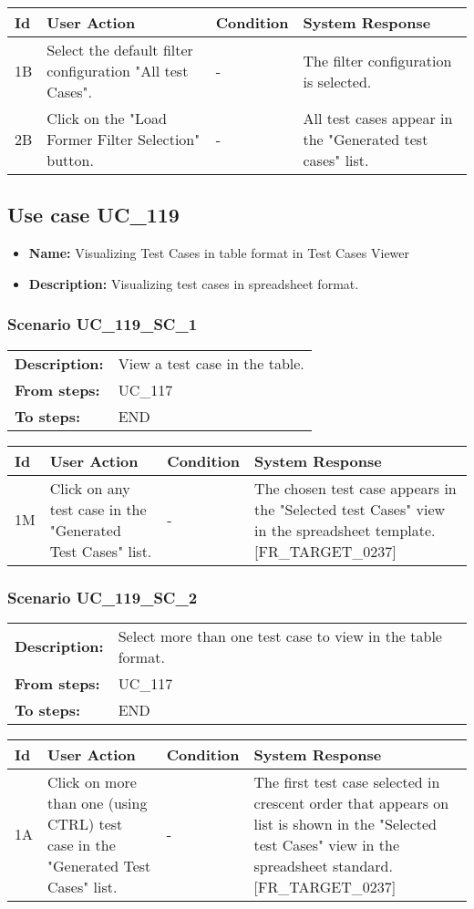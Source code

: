 \documentclass[a4paper,11pt]{article}
\newcommand{\bl}{\\ \hline}
\begin{document}
\begin{tabular}{|p{0.8in}|p{1.6in}|p{1.6in}|p{1.6in}|}
\hline
Id & User Action & Condition & System Response  \bl 
1B & Select the default filter configuration "All test Cases". & - & The filter configuration is selected. \bl 
2B & Click on the "Load Former Filter Selection" button. & - & All test cases appear in the "Generated test cases" list. \bl 
\end{tabular}
\subsection*{Use case UC_119}
\begin{itemize}
\item {\bf Name: }Visualizing Test Cases in table format in Test Cases Viewer
\item {\bf Description: }Visualizing test cases in spreadsheet format.
\end{itemize}
\subsubsection*{Scenario UC_119_SC_1}
\begin{tabular}{p{1in}p{4in}}
{\bf Description:} & View a test case in the table. \\
{\bf From steps:} & UC_117#2M \\
{\bf To steps:} & END \\
\end{tabular}
 
\begin{tabular}{|p{0.8in}|p{1.6in}|p{1.6in}|p{1.6in}|}
\hline
Id & User Action & Condition & System Response  \bl 
1M & Click on any test case in the "Generated Test Cases" list. & - & The chosen test case appears in the "Selected test Cases" view in the spreadsheet template. [FR_TARGET_0237] \bl 
\end{tabular}
\subsubsection*{Scenario UC_119_SC_2}
\begin{tabular}{p{1in}p{4in}}
{\bf Description:} & Select more than one test case to view in the table format. \\
{\bf From steps:} & UC_117#2M \\
{\bf To steps:} & END \\
\end{tabular}
 
\begin{tabular}{|p{0.8in}|p{1.6in}|p{1.6in}|p{1.6in}|}
\hline
Id & User Action & Condition & System Response  \bl 
1A & Click on more than one (using CTRL) test case in the "Generated Test Cases" list. & - & The first test case selected in crescent order that appears on list is shown in the "Selected test Cases" view in the spreadsheet standard. [FR_TARGET_0237] \bl 
\end{tabular}
\end{document}

